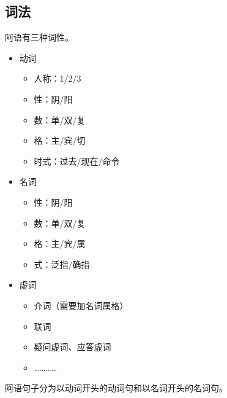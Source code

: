 \subsection{ 词法}

阿语有三种词性。

\begin{itemize}
    \item 动词
    \begin{itemize}
        \item 人称：1/2/3
        \item 性：阴/阳
        \item 数：单/双/复
        \item 格：主/宾/切
        \item 时式：过去/现在/命令
    \end{itemize}
    \item 名词
    \begin{itemize}
        \item 性：阴/阳
        \item 数：单/双/复
        \item 格：主/宾/属
        \item 式：泛指/确指
    \end{itemize}
    \item 虚词
    \begin{itemize}
        \item 介词（需要加名词属格）
        \item 联词
        \item 疑问虚词、应答虚词
        \item …………
    \end{itemize}
\end{itemize}

阿语句子分为以动词开头的动词句和以名词开头的名词句。